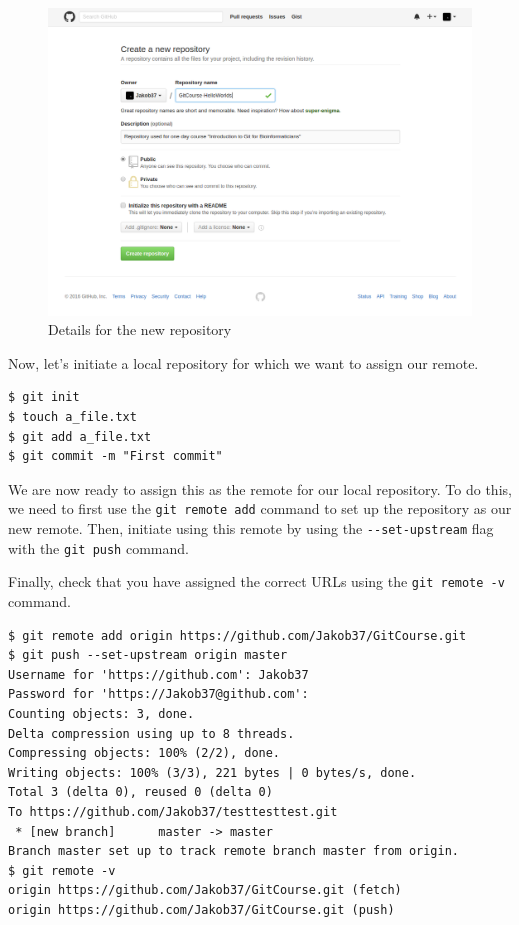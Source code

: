 \documentclass[../main/git_course_main.tex]{subfiles}
\begin{document}
\begin{figure}[h!]
	\centering
	\includegraphics[width=1.0\textwidth]{../visualizations/screenshots/git_course_hello_worlds_repo.png}
	\caption{Details for the new repository}
	\label{fig:github_repo_details}
\end{figure}

Now, let's initiate a local repository for which we want to assign our remote.

\begin{codebox}
\begin{lstlisting}
$ git init
$ touch a_file.txt
$ git add a_file.txt
$ git commit -m "First commit"
\end{lstlisting}
\end{codebox}

We are now ready to assign this as the remote for our local repository. To do this,
we need to first use the \verb$git remote add$ command to set up the repository as our new remote. Then, initiate using this remote by using the \verb$--set-upstream$ flag with the \verb$git push$ command.

Finally, check that you have assigned the correct URLs using the \verb$git remote -v$ command.

\begin{codebox}
\begin{lstlisting}
$ git remote add origin https://github.com/Jakob37/GitCourse.git
$ git push --set-upstream origin master
Username for 'https://github.com': Jakob37
Password for 'https://Jakob37@github.com': 
Counting objects: 3, done.
Delta compression using up to 8 threads.
Compressing objects: 100% (2/2), done.
Writing objects: 100% (3/3), 221 bytes | 0 bytes/s, done.
Total 3 (delta 0), reused 0 (delta 0)
To https://github.com/Jakob37/testtesttest.git
 * [new branch]      master -> master
Branch master set up to track remote branch master from origin.
$ git remote -v
origin https://github.com/Jakob37/GitCourse.git (fetch)
origin https://github.com/Jakob37/GitCourse.git (push)
\end{lstlisting}
\end{codebox}
\end{document}
